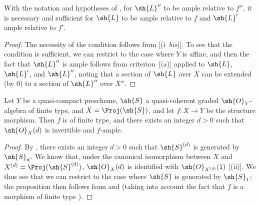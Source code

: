 \begin{proposition}[4.6.17]
\label{II.4.6.17}
With the notation and hypotheses of , for $\sh{L}''$ to be ample relative to $f''$, it is necessary and sufficient for $\sh{L}$ to be ample relative to $f$ and $\sh{L}'$ ample relative to $f'$.
\end{proposition}

\begin{proof}
The necessity of the condition follows from [(i~\emph{bis})].
To see that the condition is sufficient, we can restrict to the case where $Y$ is affine, and then the fact that $\sh{L}''$ is ample follows from criterion~[(a)] applied to $\sh{L}$, $\sh{L}'$, and $\sh{L}''$, noting that a section of $\sh{L}$ over $X$ can be extended (by $0$) to a section of $\sh{L}''$ over $X''$.
\end{proof}

\begin{proposition}[4.6.18]
\label{II.4.6.18}
Let $Y$ be a quasi-compact prescheme, $\sh{S}$ a quasi-coherent graded $\sh{O}_Y$-algebra of finite type, and $X=\Proj(\sh{S})$, and let $f:X\to Y$ be the structure morphism.
Then $f$ is of finite type, and there exists an integer $d>0$ such that $\sh{O}_X(d)$ is invertible and $f$-ample.
\end{proposition}

\begin{proof}
By , there exists an integer $d>0$ such that $\sh{S}^{(d)}$ is generated by $\sh{S}_d$.
We know that, under the canonical isomorphism between $X$ and $X^{(d)}=\Proj(\sh{S}^{(d)})$, $\sh{O}_X(d)$ is identified with $\sh{O}_{X^{(d)}}(1)$ [(ii)].
We thus see that we can restrict to the case where $\sh{S}$ is generated by $\sh{S}_1$;
the proposition then follows from  and  (taking into account the fact that $f$ is a morphism of finite type ).
\end{proof}
